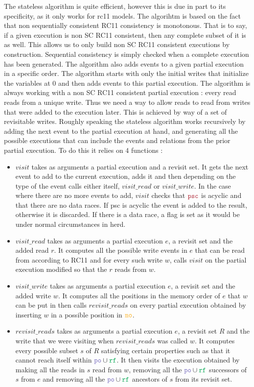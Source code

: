 \documentclass[a4,11pt,dvipsnames]{article}
\begin{document}
The stateless algorithm is quite efficient, however this is due in part to its specificity, as it only works for rc11 models. The algorihtm is based on the fact that non sequentially consistent RC11 consistency is monotonous. That is to say, if a given execution is non SC RC11 consistent, then any complete subset of it is as well. This allows us to only build non SC RC11 consistent executions by construction. Sequential consistency is simply checked when a complete execution has been generated. The algorithm also adds events to a given partial execution in a specific order. The algorithm starts with only the initial writes that initialize the variables at 0 and then adds events to this partial execution. The algorithm is always working with a non SC RC11 consistent partial execution : every read reads from a unique write. Thus we need a way to allow reads to read from writes that were added to the execution later. This is achieved by way of a set of revisitable writes.
Roughly speaking the stateless algorithm works recursively by adding the next event to the partial execution at hand, and generating all the possible executions that can include the events and relations from the prior partial execution. To do this it relies on 4 functions :

\begin{itemize}
\item $visit$ takes as arguments a partial execution and a revisit set. It gets the next event to add to the current execution, adds it and then depending on the type of the event calls either itself, $visit\_read$ or $visit\_write$. In the case where there are no more events to add, $visit$ checks that $\psc$ is acyclic and that there are no data races. If psc is acyclic the event is added to the result, otherwise it is discarded. If there is a data race, a flag is set as it would be under normal circumstances in herd.
\item $visit\_read$ takes as arguments a partial execution $e$, a revisit set and the added read $r$. It computes all the possible write events in $e$ that can be read from according to RC11 and for every such write $w$, calls $visit$ on the partial execution modified so that the $r$ reads from $w$.
\item $visit\_write$ takes as arguments a partial execution $e$, a revisit set and the added write $w$. It computes all the positions in the memory order of $e$ that $w$ can be put in then calls $revisit\_reads$ on every partial execution obtained by inserting $w$ in a possible position in $\mo$.
\item $revisit\_reads$ takes as arguments a partial execution $e$, a revisit set $R$ and the write that we were visiting when $revisit\_reads$ was called $w$. It computes every possible subset $s$ of $R$ satisfying certain properties such as that it cannot reach itself within $\po\cup\rf$. It then visits the execution obtained by making all the reads in $s$ read from $w$, removing all the $\po\cup \rf$ successors of $s$ from $e$ and removing all the $\po\cup\rf$ ancestors of $s$ from its revisit set.
\end{itemize}
\end{document}
